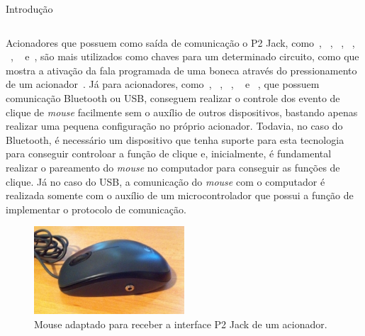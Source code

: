 \begin{chapter}{Introdução}
\begin{table}[!h]
\begin{tabular}{ccp{3cm}cp{3cm}}
	\hline
	\hline
\end{tabular}
\end{table}

Acionadores que possuem como saída de comunicação o P2 Jack,
como~\cite{CandyCorn}, ~\cite{PalPad}, ~\cite{JellyBean}, ~\cite{Chin}, ~\cite{
MicroLight}, ~\cite{HoneyBee} e~\cite{StringSwitch}, são mais utilizados como
chaves para um determinado circuito, como que mostra a ativação da fala
programada de uma boneca através do pressionamento de um
acionador~\cite{ATswitchYT}. %
Já para acionadores, como~\cite{Blue2},
~\cite{SavantElite2}, ~\cite{FootPedal}, ~\cite{FootSwitch} e ~\cite{SipPuff},
que possuem comunicação Bluetooth ou USB, conseguem realizar o controle dos
evento de clique de \textit{mouse} facilmente sem o auxílio de outros
dispositivos, bastando apenas realizar uma pequena configuração no próprio
acionador. Todavia, no caso do Bluetooth, é necessário um dispositivo que tenha
suporte para esta tecnologia para conseguir controloar a função de clique e,
inicialmente, é fundamental realizar o pareamento do \textit{mouse} no computador
para conseguir as funções de clique. Já no caso do USB, a comunicação do
\textit{mouse} com o computador é realizada somente com o auxílio de um
microcontrolador que possui a função de implementar o protocolo de comunicação.

\begin{figure}[!h]
	\centering
	\includegraphics[width=0.5\textwidth]{fig/mouse13}
	\caption{Mouse adaptado para receber a interface P2 Jack de um acionador.}
	\label{fig:mouse}
\end{figure}


\end{chapter}
